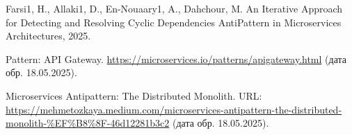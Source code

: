 \documentclass[a4paper,article,14pt]{extarticle}
\begin{document}
\begin{thebibliography}{1}
 Farsi1, H., Allaki1, D., En-Nouaary1, A., Dahchour, M. An Iterative Approach for Detecting and Resolving Cyclic Dependencies AntiPattern in Microservices Architectures, 2025.

 Pattern: API Gateway. \url{https://microservices.io/patterns/apigateway.html} (дата обр. 18.05.2025).

 Microservices Antipattern: The Distributed Monolith. URL: \url{https://mehmetozkaya.medium.com/microservices-antipattern-the-distributed-monolith-%EF%B8%8F-46d12281b3c2} (дата обр. 18.05.2025).

\end{thebibliography}


\end{document}
